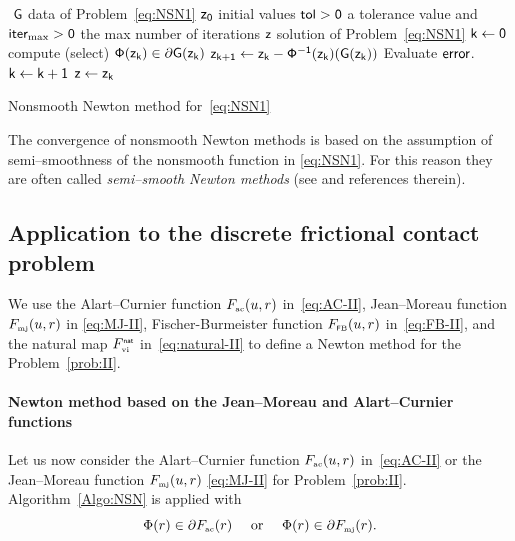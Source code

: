 {\begin{algorithm}
  \begin{algorithmic}
    {\sf
      \STATE $ $
      \REQUIRE $\sf G $ data of Problem~\eqref{eq:NSN1}
      \REQUIRE $\sf z_0$ initial values
      \REQUIRE $\sf tol >0$ a tolerance value and $\sf iter_{\max}  >0$ the max number of iterations
      \ENSURE  $\sf z$ solution of Problem~\eqref{eq:NSN1}
      \STATE   $\sf k \leftarrow 0$ 
      \STATE compute (select) $\sf \Phi(z_k) \in \partial G(z_k)$
      \STATE $\sf z_{k+1} \leftarrow   z_k -  \Phi^{-1}(z_k) (G(z_k))$
      \STATE Evaluate $\sf error$.
      \STATE $\sf k \leftarrow k+1$
      \ENDWHILE
      \STATE $\sf z \leftarrow z_{k}$ 
    }
  \end{algorithmic}
  \caption{Nonsmooth Newton method for~\eqref{eq:NSN1}}  \label{Algo:NSN}
\end{algorithm}

The convergence of nonsmooth Newton methods is based on the assumption of semi--smoothness of the nonsmooth function in \eqref{eq:NSN1}.
For this reason they are often called \emph{semi--smooth Newton methods} (see \citep[Section 7.5]{Facchinei.Pang2003} and references therein).
\subsection{Application to  the discrete frictional contact problem}
\label{Sec:NSN-AC}

{We use the Alart--Curnier function $F_{{\hbox{\tiny{ac}}}}(u,r)$ in~\eqref{eq:AC-II}, Jean--Moreau function $F_{{\hbox{\tiny{mj}}}}(u,r)$ in \eqref{eq:MJ-II},
Fischer-Burmeister function $F_{{\hbox{\tiny{\textsf FB}}}}(u,r)$ in~\eqref{eq:FB-II}, and the natural map $F_{{\hbox{\tiny{vi}}}}^{\hbox{\sf \tiny{nat}}}$ in~\eqref{eq:natural-II} to define
a Newton method for the Problem~\ref{prob:II}.}

\paragraph{Newton method based on the Jean--Moreau and  Alart--Curnier functions}


Let us now consider the Alart--Curnier function $F_{{\hbox{\tiny{ac}}}}(u,r)$ in~\eqref{eq:AC-II} or the Jean--Moreau function $F_{{\hbox{\tiny{mj}}}}(u,r)$ \eqref{eq:MJ-II} for Problem~\ref{prob:II}. 
Algorithm~\ref{Algo:NSN} is applied with
\begin{equation}  \label{eq:phiphi-ac}
    \Phi(r) \in \partial F_{\actwo}(r)\quad\text{ or } \quad   \Phi(r) \in \partial F_{\mjtwo}(r).
\end{equation}}
